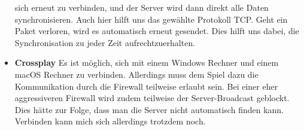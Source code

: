 \begin{itemize}
        sich erneut zu verbinden, und der Server wird dann direkt alle Daten synchronisieren. Auch hier hilft uns das gewählte Protokoll TCP. Geht ein Paket verloren, wird es automatisch
        erneut gesendet. Dies hilft uns dabei, die Synchronisation zu jeder Zeit aufrechtzuerhalten.
    \item \textbf{Crossplay}
        Es ist möglich, sich mit einem Windows Rechner und einem macOS Rechner zu verbinden. Allerdings muss dem Spiel dazu die Kommunikation durch die Firewall teilweise erlaubt sein.
        Bei einer eher aggressiveren Firewall wird zudem teilweise der Server-Broadcast geblockt. Dies hätte zur Folge, dass man die Server nicht automatisch finden kann. 
        Verbinden kann mich sich allerdings trotzdem noch.   
\end{itemize}

